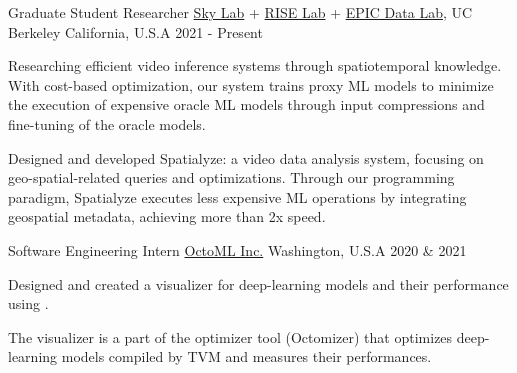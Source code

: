 

\begin{cventries}

  \cvwork
    {Graduate Student Researcher} %
    {
        \href{https://sky.cs.berkeley.edu/}{Sky Lab} +
        \href{https://rise.cs.berkeley.edu/}{RISE Lab} +
        \href{https://epic.berkeley.edu/}{EPIC Data Lab}, UC Berkeley
    } %
    {California, U.S.A} %
    {2021 - Present} %
    {
      \begin{cvitems} %
        \item{Researching efficient video inference systems through spatiotemporal knowledge.
        With cost-based optimization, our system trains proxy ML models to minimize the execution of expensive oracle ML models through input compressions and fine-tuning of the oracle models.}
        \item{Designed and developed Spatialyze: a video data analysis system, focusing on geo-spatial-related queries and optimizations. Through our programming paradigm, Spatialyze executes less expensive ML operations by integrating geospatial metadata, achieving more than 2x speed.}
      \end{cvitems}
    }

  \cvwork
    {Software Engineering Intern} %
    {\href{https://octoml.ai/}{OctoML Inc.}} %
    {Washington, U.S.A} %
    {2020 \& 2021} %
    {
      \begin{cvitems} %
          \item{Designed and created a visualizer for deep-learning models and their performance using \underline{}.}
          \item{The visualizer is a part of the optimizer tool (Octomizer) that optimizes deep-learning models compiled by TVM and measures their performances.}
      \end{cvitems}
    }


\end{cventries}
